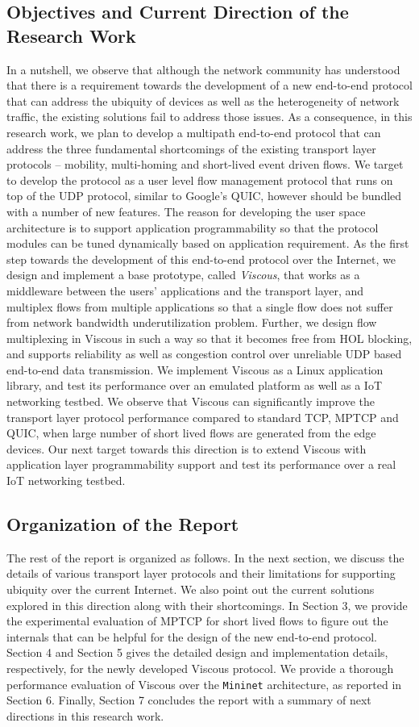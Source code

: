 \subsection{Objectives and Current Direction of the Research Work}
In a nutshell, we observe that although the network community has understood that there is a requirement towards the development of a new end-to-end protocol that can address the ubiquity of devices as well as the heterogeneity of network traffic, the existing solutions fail to address those issues. As a consequence, in this research work, we plan to develop a multipath end-to-end protocol that can address the three fundamental shortcomings of the existing transport layer protocols -- mobility, multi-homing and short-lived event driven flows. We target to develop the protocol as a user level flow management protocol that runs on top of the UDP protocol, similar to Google's QUIC, however should be bundled with a number of new features. The reason for developing the user space architecture is to support application programmability so that the protocol modules can be tuned dynamically based on application requirement. As the first step towards the development of this end-to-end protocol over the Internet, we design and implement a base prototype, called \textit{Viscous}, that works as a middleware between the users' applications and the transport layer, and multiplex flows from multiple applications so that a single flow does not suffer from network bandwidth underutilization problem. Further, we design flow multiplexing in Viscous in such a way so that it becomes free from HOL blocking, and supports reliability as well as congestion control over unreliable UDP based end-to-end data transmission. We implement Viscous as a Linux application library, and test its performance over an emulated platform as well as a IoT networking testbed. We observe that Viscous can significantly improve the transport layer protocol performance compared to standard TCP, MPTCP and QUIC, when large number of short lived flows are generated from the edge devices. Our next target towards this direction is to extend Viscous with application layer programmability support and test its performance over a real IoT networking testbed. 

\subsection{Organization of the Report}
The rest of the report is organized as follows. In the next section, we discuss the details of various transport layer protocols and their limitations for supporting ubiquity over the current Internet. We also point out the current solutions explored in this direction along with their shortcomings. In Section 3, we provide the experimental evaluation of MPTCP for short lived flows to figure out the internals that can be helpful for the design of the new end-to-end protocol. Section 4 and Section 5 gives the detailed design and implementation details, respectively, for the newly developed Viscous protocol. We provide a thorough performance evaluation of Viscous over the \texttt{Mininet} architecture, as reported in Section 6. Finally, Section 7 concludes the report with a summary of next directions in this research work. 


